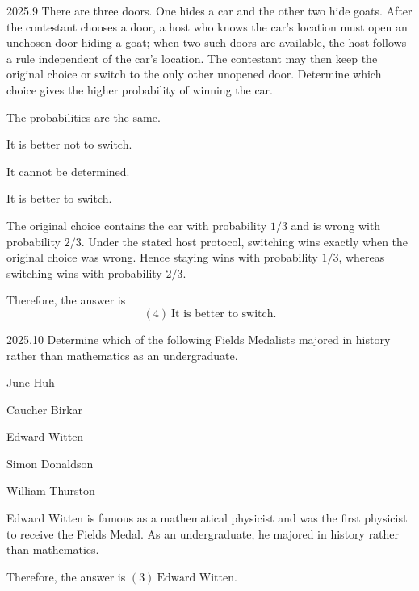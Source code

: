     \begin{pastproblem}{2025.9}
        There are three doors. One hides a car and the other two hide goats.
        After the contestant chooses a door, a host who knows the car's location
        must open an unchosen door hiding a goat; when two such doors are
        available, the host follows a rule independent of the car's location.
        The contestant may then keep the original choice or switch to the only
        other unopened door. Determine which choice gives the higher probability
        of winning the car.
        \begin{problemchoices}
            \item The probabilities are the same.
            \item It is better not to switch.
            \item It cannot be determined.
            \item It is better to switch.
        \end{problemchoices}
    \end{pastproblem}

    \begin{solution}
        The original choice contains the car with probability $1/3$ and is
        wrong with probability $2/3$. Under the stated host protocol, switching
        wins exactly when the original choice was wrong. Hence staying wins with
        probability $1/3$, whereas switching wins with probability $2/3$.

        Therefore, the answer is
        \[
            \boxed{(4)\ \text{It is better to switch}}.
        \]
    \end{solution}

    \begin{pastproblem}{2025.10}
        Determine which of the following Fields Medalists majored in history rather than mathematics
        as an undergraduate.
        \begin{problemchoices}
            \item June Huh
            \item Caucher Birkar
            \item Edward Witten
            \item Simon Donaldson
            \item William Thurston
        \end{problemchoices}
    \end{pastproblem}

    \begin{solution}
        Edward Witten is famous as a mathematical physicist and was the first physicist to receive
        the Fields Medal. As an undergraduate, he majored in history rather than mathematics.

        Therefore, the answer is $\boxed{(3)\ \text{Edward Witten}}$.
    \end{solution}

